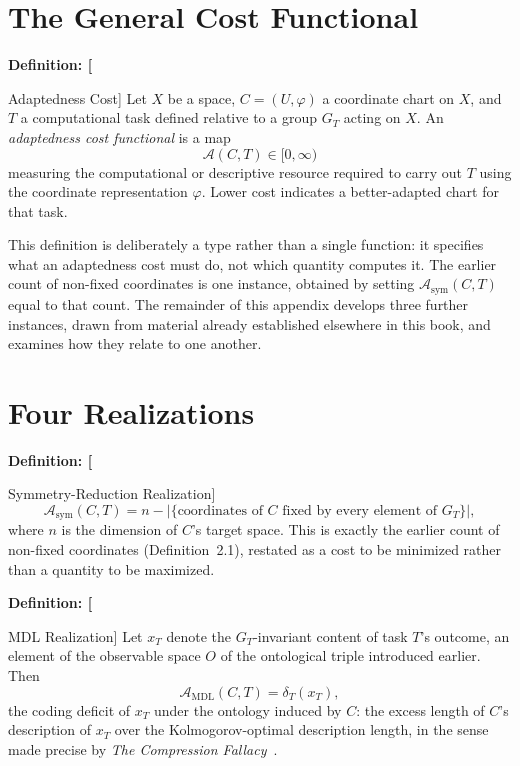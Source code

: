 \documentclass[11pt,fleqn]{book}
\numberwithin{equation}{chapter}
\newenvironment{definition}[1]
  {\begin{definitionEnv}
   \noindent\textbf{Definition: #1}\par\smallskip}
  {\end{definitionEnv}}
\theoremstyle{plain}
\theoremstyle{definition}
\theoremstyle{remark}
\begin{document}
\section{The General Cost Functional}

\begin{definition}[Adaptedness Cost]
Let \(X\) be a space, \(C=(U,\varphi)\) a coordinate chart on \(X\), and \(T\) a computational task defined relative to a group \(G_T\) acting on \(X\). An \emph{adaptedness cost functional} is a map
\[
\mathcal A(C,T) \in [0,\infty)
\]
measuring the computational or descriptive resource required to carry out \(T\) using the coordinate representation \(\varphi\). Lower cost indicates a better-adapted chart for that task.
\end{definition}

This definition is deliberately a type rather than a single function: it specifies what an adaptedness cost must do, not which quantity computes it. The earlier count of non-fixed coordinates is one instance, obtained by setting \(\mathcal A_{\mathrm{sym}}(C,T)\) equal to that count. The remainder of this appendix develops three further instances, drawn from material already established elsewhere in this book, and examines how they relate to one another.

\section{Four Realizations}

\begin{definition}[Symmetry-Reduction Realization]
\[
\mathcal A_{\mathrm{sym}}(C,T) = n - \bigl|\{\text{coordinates of } C \text{ fixed by every element of } G_T\}\bigr|,
\]
where \(n\) is the dimension of \(C\)'s target space. This is exactly the earlier count of non-fixed coordinates (Definition~2.1), restated as a cost to be minimized rather than a quantity to be maximized.
\end{definition}

\begin{definition}[MDL Realization]
Let \(x_T\) denote the \(G_T\)-invariant content of task \(T\)'s outcome, an element of the observable space \(O\) of the ontological triple introduced earlier. Then
\[
\mathcal A_{\mathrm{MDL}}(C,T) = \delta_T(x_T),
\]
the coding deficit of \(x_T\) under the ontology induced by \(C\): the excess length of \(C\)'s description of \(x_T\) over the Kolmogorov-optimal description length, in the sense made precise by \emph{The Compression Fallacy}~\cite{compression-fallacy}.
\end{definition}
\end{document}
